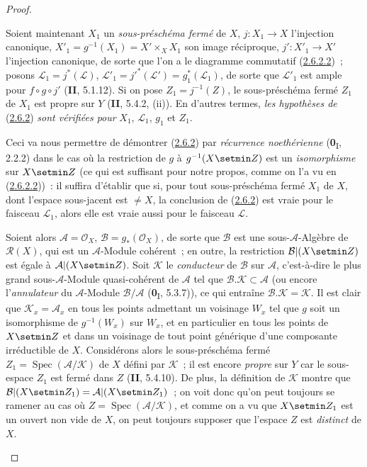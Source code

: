 \begin{proof}
\begin{env}[2.6.2.3]
\label{III.2.6.2.3-fr}
Soient maintenant $X_1$ un \emph{sous-préschéma fermé} de $X$,
$j:X_1\to X$ l'injection canonique,
$X'_1=g^{-1}(X_1)=X'\times_X X_1$ son image réciproque,
$j':X'_1\to X'$ l'injection canonique, de sorte que l'on a le diagramme
commutatif (\hyperref[III.2.6.2.2-fr]{2.6.2.2})~; posons
$\mathcal L_1=j^*(\mathcal L)$,
$\mathcal L'_1=j'^*(\mathcal L')=g_1^*(\mathcal L_1)$, de sorte que
$\mathcal L'_1$ est ample pour $f\circ g\circ j'$ (\textbf{II}, 5.1.12). Si on
pose $Z_1=j^{-1}(Z)$, le sous-préschéma fermé $Z_1$ de $X_1$ est propre
sur $Y$ (\textbf{II}, 5.4.2, (ii)). En d'autres termes, \emph{les hypothèses de}
(\hyperref[III.2.6.2-fr]{2.6.2}) \emph{sont vérifiées pour} $X_1$,
$\mathcal L_1$, $g_1$ et $Z_1$.
\end{env}

Ceci va nous permettre de démontrer
(\hyperref[III.2.6.2-fr]{2.6.2}) par \emph{récurrence noethérienne}
(\textbf{0}\textsubscript{I}, 2.2.2) dans le cas où la restriction de $g$ à
$g^{-1}(X\setmin Z)$ est un \emph{isomorphisme} sur $X\setmin Z$ (ce qui est suffisant pour
notre propos, comme on l'a vu en
(\hyperref[III.2.6.2.2-fr]{2.6.2.2}))~: il suffira d'établir que si, pour
tout sous-préschéma fermé $X_1$ de $X$, dont l'espace sous-jacent est
$\neq X$, la conclusion de (\hyperref[III.2.6.2-fr]{2.6.2}) est vraie
pour le faisceau $\mathcal L_1$, alors elle est vraie aussi pour le
faisceau $\mathcal L$.

\begin{env}[2.6.2.4]
\label{III.2.6.2.4-fr}
Soient alors $\mathcal A=\mathcal O_X$, $\mathcal B=g_*(\mathcal O_X)$,
de sorte que $\mathcal B$ est une sous-$\mathcal A$-Algèbre de
$\mathcal R(X)$, qui est un $\mathcal A$-Module cohérent~; en outre, la
restriction $\mathcal B|(X\setmin Z)$ est égale à $\mathcal A|(X\setmin Z)$. Soit
$\mathcal K$ le \emph{conducteur} de $\mathcal B$ sur $\mathcal A$, c'est-à-dire
le plus grand sous-$\mathcal A$-Module quasi-cohérent de $\mathcal A$ tel
que $\mathcal B.\mathcal K\subset\mathcal A$ (ou encore l'\emph{annulateur} du
$\mathcal A$-Module $\mathcal B/\mathcal A$
(\textbf{0}\textsubscript{I}, 5.3.7)), ce qui entraîne
$\mathcal B.\mathcal K=\mathcal K$. Il est clair que
$\mathcal K_x=\mathcal A_x$ en tous les points admettant un voisinage
$W_x$ tel que $g$ soit un isomorphisme de $g^{-1}(W_x)$ sur $W_x$, et en
particulier en tous les points de $X\setmin Z$ et dans un voisinage de tout
point générique d'une composante irréductible de $X$. Considérons alors
le sous-préschéma fermé $Z_1=\operatorname{Spec}(\mathcal A/\mathcal K)$
de $X$ défini par $\mathcal K$~; il est encore \emph{propre} sur $Y$ car le
sous-espace $Z_1$ est fermé dans $Z$ (\textbf{II}, 5.4.10). De plus, la définition
de $\mathcal K$ montre que
$\mathcal B|(X\setmin Z_1)=\mathcal A|(X\setmin Z_1)$~; on voit donc qu'on peut toujours
se ramener au cas où
$Z=\operatorname{Spec}(\mathcal A/\mathcal K)$, et comme on a vu que
$X\setmin Z_1$ est un ouvert non vide de $X$, on peut toujours supposer que
l'espace $Z$ est \emph{distinct} de $X$.
\end{env}


\end{proof}
